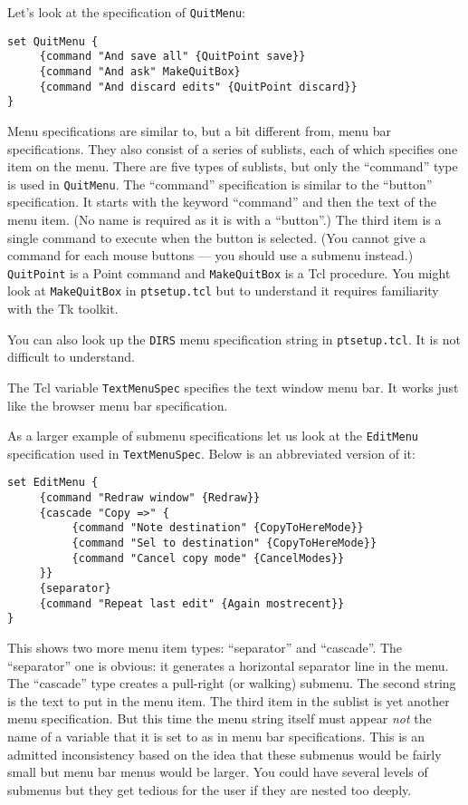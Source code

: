 Let's look at the specification of {\tt QuitMenu}:
\begin{verbatim}
set QuitMenu {
     {command "And save all" {QuitPoint save}}
     {command "And ask" MakeQuitBox}
     {command "And discard edits" {QuitPoint discard}}
}
\end{verbatim}

Menu specifications are similar to, but a bit different from,
menu bar specifications.
They also consist of a series of sublists,
each of which specifies one item on the menu.
There are five types of sublists,
but only the ``command'' type is used in {\tt QuitMenu}.
The ``command'' specification is similar to the ``button'' specification.
It starts with the keyword ``command'' and then the text of the
menu item.
(No name is required as it is with a ``button''.)
The third item is a single command to execute when the button is selected.
(You cannot give a command for each mouse buttons --- you should
use a submenu instead.)
{\tt QuitPoint} is a Point command and {\tt MakeQuitBox} is a Tcl procedure.
You might look at {\tt MakeQuitBox} in {\tt ptsetup.tcl}
but to understand it requires familiarity with the Tk toolkit.

You can also look up the {\tt DIRS} menu specification string in
{\tt ptsetup.tcl}.
It is not difficult to understand.

The Tcl variable {\tt TextMenuSpec} specifies
the text window menu bar.
It works just like the browser menu bar specification.

As a larger example of submenu specifications
let us look at the {\tt EditMenu} specification
used in {\tt TextMenuSpec}.
Below is an abbreviated version of it:
\begin{verbatim}
set EditMenu {
     {command "Redraw window" {Redraw}}
     {cascade "Copy =>" {
          {command "Note destination" {CopyToHereMode}}
          {command "Sel to destination" {CopyToHereMode}}
          {command "Cancel copy mode" {CancelModes}}
     }}
     {separator}
     {command "Repeat last edit" {Again mostrecent}}
}
\end{verbatim}
This shows two more menu item types: ``separator'' and ``cascade''.
The ``separator'' one is obvious:
it generates a horizontal separator line in the menu.
The ``cascade'' type creates a pull-right (or walking) submenu.
The second string is the text to put in the menu item.
The third item in the sublist is yet another menu specification.
But this time the menu string itself must appear {\it not}
the name of a variable that it is set to as in menu bar specifications.
This is an admitted inconsistency based on the idea that these
submenus would be fairly small but menu bar menus would be larger.
You could have several levels of submenus but they get tedious for
the user if they are nested too deeply.

